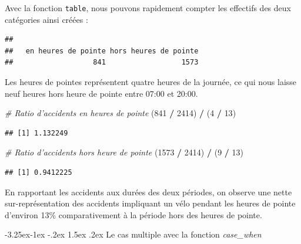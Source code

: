 \documentclass[
  11pt,
  french,
]{book}
\makeatletter
\newenvironment{Shaded}{\begin{snugshade}}{\end{snugshade}}
\newcommand{\CommentTok}[1]{\textcolor[rgb]{0.56,0.35,0.01}{\textit{#1}}}
\newcommand{\DecValTok}[1]{\textcolor[rgb]{0.00,0.00,0.81}{#1}}
\newcommand{\KeywordTok}[1]{\textcolor[rgb]{0.13,0.29,0.53}{\textbf{#1}}}
\newcommand{\NormalTok}[1]{#1}
\newcommand{\OperatorTok}[1]{\textcolor[rgb]{0.81,0.36,0.00}{\textbf{#1}}}
\newcommand{\StringTok}[1]{\textcolor[rgb]{0.31,0.60,0.02}{#1}}
\newenvironment{kframe}{%
\medskip{}
\setlength{\fboxsep}{.8em}
 \def\at@end@of@kframe{}%
 \ifinner\ifhmode%
  \def\at@end@of@kframe{\end{minipage}}%
  \begin{minipage}{\columnwidth}%
 \fi\fi%
 \def\FrameCommand##1{\hskip\@totalleftmargin \hskip-\fboxsep
 \colorbox{shadecolor}{##1}\hskip-\fboxsep
     \hskip-\linewidth \hskip-\@totalleftmargin \hskip\columnwidth}%
 \MakeFramed {\advance\hsize-\width
   \@totalleftmargin\z@ \linewidth\hsize
   \@setminipage}}%
 {\par\unskip\endMakeFramed%
 \at@end@of@kframe}
\renewenvironment{Shaded}{\begin{kframe}}{\end{kframe}}
\renewcommand\paragraph{\@startsection{paragraph}{4}{\z@}%
   {-3.25ex\@plus -1ex \@minus -.2ex}%
   {1.5ex \@plus .2ex}%
   {\normalfont\normalsize\bfseries}}
\makeatother
\begin{document}
Avec la fonction \texttt{table}, nous pouvons rapidement compter les effectifs des deux catégories ainsi créées :

\begin{Shaded}
\end{Shaded}

\begin{verbatim}
## 
##   en heures de pointe hors heures de pointe 
##                   841                  1573
\end{verbatim}

Les heures de pointes représentent quatre heures de la journée, ce qui nous laisse neuf heures hors heure de pointe entre 07:00 et 20:00.

\begin{Shaded}
\begin{Highlighting}[]
\CommentTok{# Ratio d'accidents en heures de pointe}
\NormalTok{(}\DecValTok{841} \OperatorTok{/}\StringTok{ }\DecValTok{2414}\NormalTok{) }\OperatorTok{/}\StringTok{ }\NormalTok{(}\DecValTok{4} \OperatorTok{/}\StringTok{ }\DecValTok{13}\NormalTok{)}
\end{Highlighting}
\end{Shaded}

\begin{verbatim}
## [1] 1.132249
\end{verbatim}

\begin{Shaded}
\begin{Highlighting}[]
\CommentTok{# Ratio d'accidents hors heure de pointe}
\NormalTok{(}\DecValTok{1573} \OperatorTok{/}\StringTok{ }\DecValTok{2414}\NormalTok{) }\OperatorTok{/}\StringTok{ }\NormalTok{(}\DecValTok{9} \OperatorTok{/}\StringTok{ }\DecValTok{13}\NormalTok{)}
\end{Highlighting}
\end{Shaded}

\begin{verbatim}
## [1] 0.9412225
\end{verbatim}

En rapportant les accidents aux durées des deux périodes, on observe une nette sur-représentation des accidents impliquant un vélo pendant les heures de pointe d'environ 13\% comparativement à la période hors des heures de pointe.

\hypertarget{sect014272}{%
\paragraph{\texorpdfstring{Le cas multiple avec la fonction \emph{case\_when}}{Le cas multiple avec la fonction case\_when}}\label{sect014272}}
\end{document}
